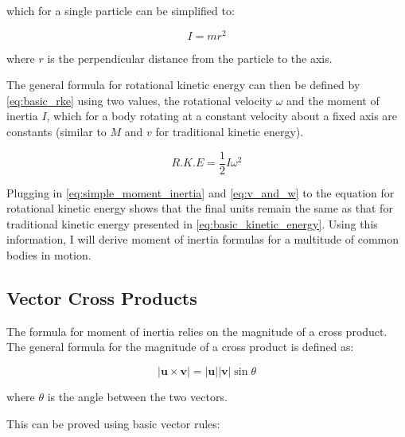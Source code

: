 which for a single particle can be simplified to:

\begin{equation}
I = mr^2
\label{eq:simple_moment_inertia}
\end{equation}

where $r$ is the perpendicular distance from the particle to the axis.

The general formula for rotational kinetic energy can then be defined by \cref{eq:basic_rke} using two values, the rotational velocity $\omega$ and the moment of inertia $I$, which for a body rotating at a constant velocity about a fixed axis are constants (similar to $M$ and $v$ for traditional kinetic energy).

\begin{equation}
R.K.E = \frac{1}{2}I\omega^2
\label{eq:basic_rke}
\end{equation}

Plugging in \cref{eq:simple_moment_inertia} and \cref{eq:v_and_w} to the equation for rotational kinetic energy shows that the final units remain the same as that for traditional kinetic energy presented in \cref{eq:basic_kinetic_energy}. Using this information, I will derive moment of inertia formulas for a multitude of common bodies in motion.

\subsection{Vector Cross Products}

The formula for moment of inertia relies on the magnitude of a cross product. The general formula for the magnitude of a cross product is defined as:

\begin{equation}
|\bm{u} \times \bm{v}| = |\bm{u}||\bm{v}|\sin{\theta}
\label{eq:cross_product}
\end{equation}

where $\theta$ is the angle between the two vectors.

This can be proved using basic vector rules:

